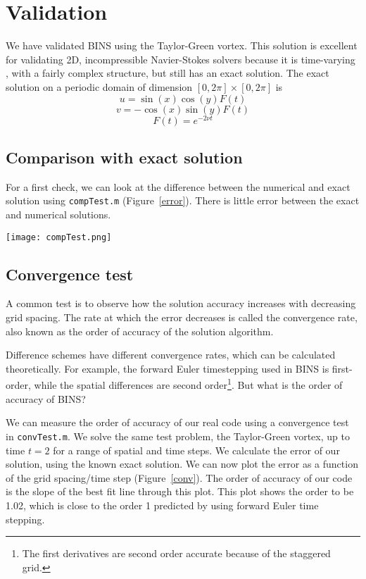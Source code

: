 \documentclass[12pt]{article}
\begin{document}
\section{Validation}
We have validated BINS using the Taylor-Green vortex.  This solution is excellent for validating 2D, incompressible Navier-Stokes solvers because it is time-varying , with a fairly complex structure, but still has an exact solution.  
The exact solution on a periodic domain of dimension $[0,2\pi] \times [0,2\pi]$ is
\[ u=\sin (x) \cos (y) F(t)\]
\[ v=-\cos (x) \sin (y) F(t)\]
\[ F(t)=e^{-2\nu t}\]

\subsection{Comparison with exact solution}
For a first check, we can look at the difference between the numerical and exact solution using \texttt{compTest.m} (Figure~\ref{error}).  There is little error between the exact and numerical solutions.

\begin{center}
\begin{figure*}
\center
\texttt{[image: compTest.png]} 
\caption{Numerical and exact solution at $t=2$ on a grid of size $N=64$.  Solutions are at $y=\pi/2$, varying in $x$.}
\label{error}
\end{figure*}
\end{center}

\subsection{Convergence test}
A common test is to observe how the solution accuracy increases with decreasing grid spacing.  The rate at which the error decreases is called the convergence rate, also known as the order of accuracy of the solution algorithm.  

Difference schemes have different convergence rates, which can be calculated theoretically.  For example, the forward Euler timestepping used in BINS is first-order, while the spatial differences are second order\footnote{The first derivatives are second order accurate because of the staggered grid.}.  But what is the order of accuracy of BINS?

We can measure the order of accuracy of our real code using a convergence test in \texttt{convTest.m}.  We solve the same test problem, the Taylor-Green vortex, up to time $t=2$ for a range of spatial and time steps.  We calculate the error of our solution, using the known exact solution.  We can now plot the error as a function of the grid spacing/time step (Figure~\ref{conv}).  The order of accuracy of our code is the slope of the best fit line through this plot.  This plot shows the order to be 1.02, which is close to the order 1 predicted by using forward Euler time stepping.
\end{document}
